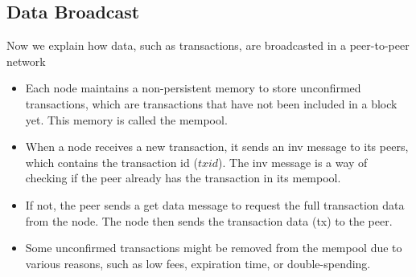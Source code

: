 \subsection{Data Broadcast}
Now we explain how data, such as transactions, are broadcasted in a peer-to-peer network
\begin{itemize}
    \item Each node maintains a non-persistent memory to store unconfirmed transactions, which are transactions that have not been included in a block yet. This memory is called the mempool.
    \item When a node receives a new transaction, it sends an inv message to its peers, which contains the transaction id ($txid$). The inv message is a way of checking if the peer already has the transaction in its mempool.
    \item If not, the peer sends a get data message to request the full transaction data from the node. The node then sends the transaction data (tx) to the peer.
    \item Some unconfirmed transactions might be removed from the mempool due to various reasons, such as low fees, expiration time, or double-spending.
\end{itemize}
